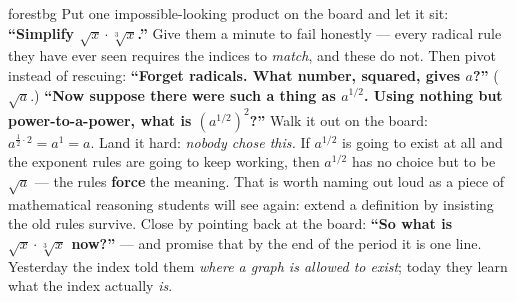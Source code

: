 \documentclass[10pt]{article}
\begin{document}
\begin{skillbox}[Hook]{forestbg}
    Put one impossible-looking product on the board and let it sit: \textbf{``Simplify
    $\sqrt{x}\cdot\sqrt[3]{x}$.''} Give them a minute to fail honestly --- every radical rule they
    have ever seen requires the indices to \emph{match}, and these do not. Then pivot instead of
    rescuing: \textbf{``Forget radicals. What number, squared, gives $a$?''} ($\sqrt{a}$.)
    \textbf{``Now suppose there were such a thing as $a^{1/2}$. Using nothing but power-to-a-power,
    what is $\left(a^{1/2}\right)^{2}$?''} Walk it out on the board:
    $a^{\frac12\cdot2}=a^{1}=a$. Land it hard: \emph{nobody chose this.} If $a^{1/2}$ is going to
    exist at all and the exponent rules are going to keep working, then $a^{1/2}$ has no choice but
    to be $\sqrt{a}$ --- the rules \textbf{force} the meaning. That is worth naming out loud as a
    piece of mathematical reasoning students will see again: extend a definition by insisting the
    old rules survive. Close by pointing back at the board: \textbf{``So what is $\sqrt{x}\cdot
    \sqrt[3]{x}$ now?''} --- and promise that by the end of the period it is one line. Yesterday the
    index told them \emph{where a graph is allowed to exist}; today they learn what the index
    actually \emph{is}.
\end{skillbox}
\end{document}

